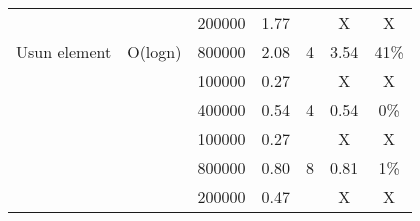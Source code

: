 \documentclass{article}
\begin{document}
\begin{table}[H]
{\begin{tabular}{|ccccccc|}
                \multicolumn{1}{|c|}{} & \multicolumn{1}{c|}{} & \multicolumn{1}{c|}{200000} & \multicolumn{1}{c|}{1.77} & \multicolumn{1}{c|}{} & \multicolumn{1}{c|}{X} & X \\ \cline{3-4} \cline{6-7} 
                \multicolumn{1}{|c|}{\multirow{-6}{*}{Usun element}} & \multicolumn{1}{c|}{\multirow{-6}{*}{O(logn)}} & \multicolumn{1}{c|}{800000} & \multicolumn{1}{c|}{2.08} & \multicolumn{1}{c|}{\multirow{-2}{*}{4}} & \multicolumn{1}{c|}{3.54} & 41\% \\ \hline
                \rowcolor[HTML]{F4FFF4} 
                \multicolumn{1}{|c|}{\cellcolor[HTML]{F4FFF4}} & \multicolumn{1}{c|}{\cellcolor[HTML]{F4FFF4}} & \multicolumn{1}{c|}{\cellcolor[HTML]{F4FFF4}100000} & \multicolumn{1}{c|}{\cellcolor[HTML]{F4FFF4}0.27} & \multicolumn{1}{c|}{\cellcolor[HTML]{F4FFF4}} & \multicolumn{1}{c|}{\cellcolor[HTML]{F4FFF4}X} & X \\ \cline{3-4} \cline{6-7} 
                \rowcolor[HTML]{F4FFF4} 
                \multicolumn{1}{|c|}{\cellcolor[HTML]{F4FFF4}} & \multicolumn{1}{c|}{\cellcolor[HTML]{F4FFF4}} & \multicolumn{1}{c|}{\cellcolor[HTML]{F4FFF4}400000} & \multicolumn{1}{c|}{\cellcolor[HTML]{F4FFF4}0.54} & \multicolumn{1}{c|}{\multirow{-2}{*}{\cellcolor[HTML]{F4FFF4}4}} & \multicolumn{1}{c|}{\cellcolor[HTML]{F4FFF4}0.54} & 0\% \\ \cline{3-7} 
                \rowcolor[HTML]{F4FFF4} 
                \multicolumn{1}{|c|}{\cellcolor[HTML]{F4FFF4}} & \multicolumn{1}{c|}{\cellcolor[HTML]{F4FFF4}} & \multicolumn{1}{c|}{\cellcolor[HTML]{F4FFF4}100000} & \multicolumn{1}{c|}{\cellcolor[HTML]{F4FFF4}0.27} & \multicolumn{1}{c|}{\cellcolor[HTML]{F4FFF4}} & \multicolumn{1}{c|}{\cellcolor[HTML]{F4FFF4}X} & X \\ \cline{3-4} \cline{6-7} 
                \rowcolor[HTML]{F4FFF4} 
                \multicolumn{1}{|c|}{\cellcolor[HTML]{F4FFF4}} & \multicolumn{1}{c|}{\cellcolor[HTML]{F4FFF4}} & \multicolumn{1}{c|}{\cellcolor[HTML]{F4FFF4}800000} & \multicolumn{1}{c|}{\cellcolor[HTML]{F4FFF4}0.80} & \multicolumn{1}{c|}{\multirow{-2}{*}{\cellcolor[HTML]{F4FFF4}8}} & \multicolumn{1}{c|}{\cellcolor[HTML]{F4FFF4}0.81} & 1\% \\ \cline{3-7} 
                \rowcolor[HTML]{F4FFF4} 
                \multicolumn{1}{|c|}{\cellcolor[HTML]{F4FFF4}} & \multicolumn{1}{c|}{\cellcolor[HTML]{F4FFF4}} & \multicolumn{1}{c|}{\cellcolor[HTML]{F4FFF4}200000} & \multicolumn{1}{c|}{\cellcolor[HTML]{F4FFF4}0.47} & \multicolumn{1}{c|}{\cellcolor[HTML]{F4FFF4}} & \multicolumn{1}{c|}{\cellcolor[HTML]{F4FFF4}X} & X \\ \cline{3-4} \cline{6-7} 

\end{tabular}}
\end{table}
\end{document}
